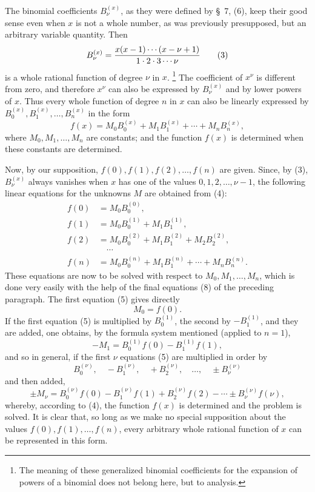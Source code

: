 \documentclass[11pt]{article}
\begin{document}
The binomial coefficients $B_\nu^{(x)}$, as they were defined by \S~7, (6), keep their good sense even when $x$ is not a whole number, as was previously presupposed, but an arbitrary variable quantity. Then
\begin{equation}
 B_\nu^{(x)}={x(x-1)\cdots(x-\nu+1)\over 1\cdot2\cdot3\cdots\nu}
\tag{3}
\end{equation}
is a whole rational function of degree $\nu$ in $x$.
\footnote{The meaning of these generalized binomial coefficients for the expansion of powers of a binomial does not belong here, but to analysis.}
The coefficient of $x^\nu$ is different from zero, and therefore $x^\nu$ can also be expressed by $B_\nu^{(x)}$ and by lower powers of $x$. Thus every whole function of degree $n$ in $x$ can also be linearly expressed by $B_0^{(x)},B_1^{(x)},\ldots,B_n^{(x)}$ in the form
\begin{equation}
 f(x)=M_0B_0^{(x)}+M_1B_1^{(x)}+\cdots+M_nB_n^{(x)},
\tag{4}
\end{equation}
where $M_0,M_1,\ldots,M_n$ are constants; and the function $f(x)$ is determined when these constants are determined.

Now, by our supposition, $f(0),f(1),f(2),\ldots,f(n)$ are given. Since, by (3), $B_\nu^{(x)}$ always vanishes when $x$ has one of the values $0,1,2,\ldots,\nu-1$, the following linear equations for the unknowns $M$ are obtained from (4):
\begin{equation}
\begin{aligned}
 f(0)&=M_0B_0^{(0)},\\
 f(1)&=M_0B_0^{(1)}+M_1B_1^{(1)},\\
 f(2)&=M_0B_0^{(2)}+M_1B_1^{(2)}+M_2B_2^{(2)},\\
 &\quad\cdots\\
 f(n)&=M_0B_0^{(n)}+M_1B_1^{(n)}+\cdots+M_nB_n^{(n)}.
\end{aligned}
\tag{5}
\end{equation}
These equations are now to be solved with respect to $M_0,M_1,\ldots,M_n$, which is done very easily with the help of the final equations (8) of the preceding paragraph. The first equation (5) gives directly
\begin{equation}
 M_0=f(0).
\tag{6}
\end{equation}
If the first equation (5) is multiplied by $B_0^{(1)}$, the second by $-B_1^{(1)}$, and they are added, one obtains, by the formula system mentioned (applied to $n=1$),
\[
 -M_1=B_0^{(1)}f(0)-B_1^{(1)}f(1),
\]
and so in general, if the first $\nu$ equations (5) are multiplied in order by
\[
 B_0^{(\nu)},\quad -B_1^{(\nu)},\quad +B_2^{(\nu)},\quad \ldots,\quad \pm B_\nu^{(\nu)}
\]
and then added,
\begin{equation}
 \pm M_\nu=B_0^{(\nu)}f(0)-B_1^{(\nu)}f(1)+B_2^{(\nu)}f(2)-\cdots\pm B_\nu^{(\nu)}f(\nu),
\tag{7}
\end{equation}
whereby, according to (4), the function $f(x)$ is determined and the problem is solved. It is clear that, so long as we make no special supposition about the values $f(0),f(1),\ldots,f(n)$, every arbitrary whole rational function of $x$ can be represented in this form.
\end{document}
